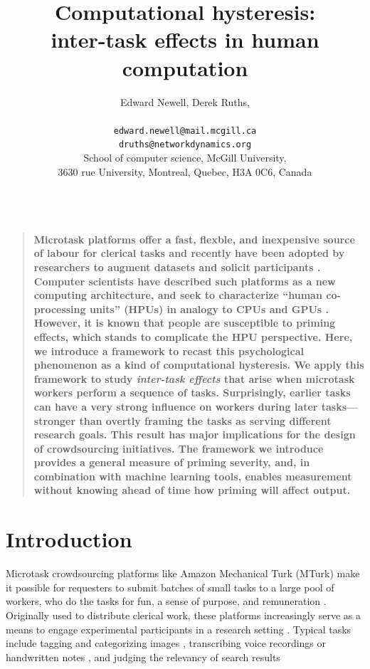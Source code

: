 \documentclass[12pt]{article}
\title{Computational hysteresis:\\ inter-task effects in human computation}
\author
{Edward Newell, Derek Ruths,\\
\\
\normalsize{\texttt{edward.newell@mail.mcgill.ca}}\\
\normalsize{\texttt{druths@networkdynamics.org}}\\
\normalsize{School of computer science, McGill University,}\\
\normalsize{3630 rue University, Montreal, Quebec, H3A 0C6, Canada}\\
\\
}
\date{}
\newenvironment{sciabstract}{%
\begin{quote} \bf}
{\end{quote}}
\begin{document}
 


\baselineskip24pt


\maketitle 




\begin{sciabstract}
Microtask platforms offer a fast, flexble, and inexpensive source of labour for
clerical tasks \cite{Finnerty2013, chandler2013breaking, Berinsky2012351} and 
recently have been adopted by researchers to augment datasets and solicit 
participants \cite{paolacci2010running, Berinsky2012351, chandler2013breaking}.
Computer scientists have described such platforms as a new computing 
architecture, and seek to characterize “human co-processing units” (HPUs) in 
analogy to CPUs and GPUs \cite{5543192}. However, it is known that people are 
susceptible to 
priming effects\cite{No2007,Swaab200299,Gopher2000308,sohn2001task,Ghuman17062008,BJOP1796,BJOP1826,Gass1999549}, which stands to complicate the HPU 
perspective.  Here, we introduce a framework to recast this psychological 
phenomenon as a kind of computational hysteresis. 
We apply this framework to study \textit{inter-task effects} that arise when 
microtask 
workers perform a sequence of tasks. Surprisingly, earlier tasks can have a 
very strong influence on workers during later tasks---stronger than overtly
framing the tasks as serving different research goals.   
This result has major implications for the design of crowdsourcing initiatives.
The framework we introduce provides a general measure of priming severity, 
and, in combination with machine learning tools, enables measurement without
knowing ahead of time how priming will affect output.
\end{sciabstract}

\section*{Introduction}
Microtask crowdsourcing platforms like Amazon Mechanical Turk (MTurk) make it 
possible for requesters to submit batches of small tasks to a large pool of 
workers, who do the tasks for fun, a sense of purpose, and remuneration 
\cite{kazai2013analysis,Antin20122925}.  
Originally used to distribute clerical work, these platforms 
increasingly serve as a means to engage experimental 
participants in a research 
setting \cite{paolacci2010running,Berinsky2012351,snow2008cheap,alonso2009can}.
Typical tasks include tagging and categorizing images 
\cite{6116320,Zhai2012357}, transcribing voice recordings 
\cite{chandler2013breaking,paolacci2010running}
or handwritten notes \cite{Berinsky2012351,Finnerty2013}, and judging the 
relevancy of search results \cite{le2010ensuring,grady2010crowdsourcing,alonso2009can,kazai2013analysis}
\end{document}
